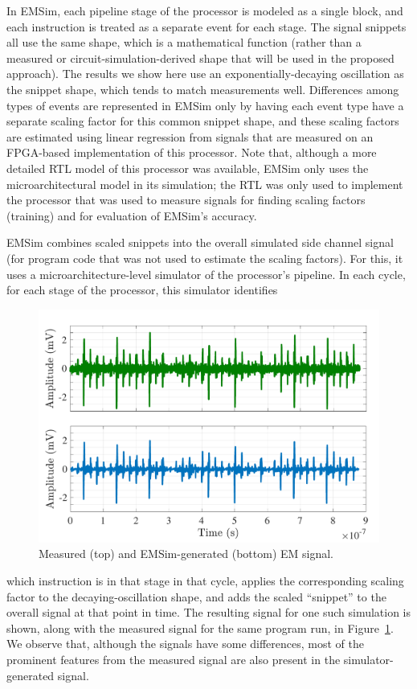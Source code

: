 In EMSim, each pipeline stage of the processor is modeled as a single block, and each instruction is treated as a separate event for each stage. The signal snippets all use the same shape, which is a mathematical function (rather than a measured or circuit-simulation-derived shape that will be used in the proposed approach).
The results we show here use an exponentially-decaying oscillation as the snippet shape,
which tends to match measurements well.
Differences among types of events are represented in EMSim only by having each event type have a separate scaling factor for this common snippet shape, and
these scaling factors are estimated using linear regression from signals that are measured on an FPGA-based implementation of this processor. Note that, although a more detailed RTL model of this processor was available, EMSim only uses the microarchitectural model in its simulation; the RTL was only used to implement the processor that was used to measure signals for finding scaling factors (training) and for evaluation of EMSim's accuracy.

EMSim combines scaled snippets into the overall simulated side channel signal (for program code that was not used to estimate the scaling factors). For this, it uses a microarchitecture-level simulator of the processor's pipeline.
In each cycle, for each stage of the processor, this simulator identifies
\begin{figure}
	\centering
		\vspace{-0.15in}
	\includegraphics[width=0.45\columnwidth,clip]{figure/bench.pdf}
	\vspace{-0.3in}
	\caption{Measured (top) and EMSim-generated (bottom) EM signal.}
	\label{fig:bench}
	\vspace{-0.1in}
\end{figure}
 which instruction is in that stage in that cycle, applies the corresponding scaling factor to the
decaying-oscillation shape, and adds the scaled ``snippet'' to the overall signal at that point in time.
The resulting signal for one such simulation is shown, along with the measured signal for the same program run, in Figure~\ref{fig:bench}. We observe that, although the signals have some differences, most of the prominent features from the measured signal are also present in the simulator-generated signal.

